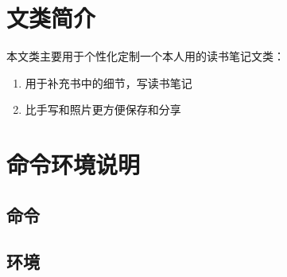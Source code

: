 \documentclass{xdyy-usermanual}
\begin{document}
\maketitle
\tableofcontents


\section{文类简介}

本文类主要用于个性化定制一个本人用的读书笔记文类：

\begin{enumerate}
  \item 用于补充书中的细节，写读书笔记
  \item 比手写和照片更方便保存和分享
\end{enumerate}


\section{命令环境说明}


\subsection{命令}


\subsection{环境}
\end{document}
